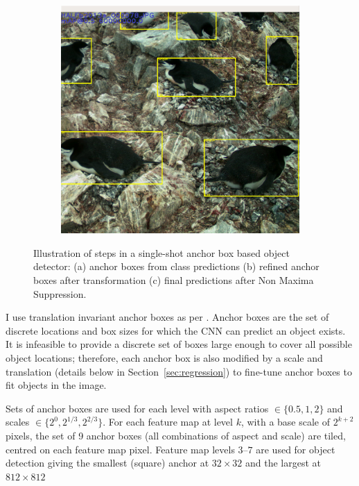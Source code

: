 \begin{figure}[htb]
\begin{subfigure}[t]{0.30\textwidth}
  \caption{}
  \end{subfigure}%
  \begin{subfigure}[t]{0.32\textwidth}
  \includegraphics[width=0.95\linewidth]{figures/object/final.png}
  \caption{}
  \end{subfigure}%
  \caption{Illustration of steps in a single-shot anchor box based object detector: (a) anchor boxes from class predictions (b) refined anchor boxes after transformation (c) final predictions after Non Maxima Suppression.   }
  \label{fig:anchor_boxes}
\end{figure}


I use translation invariant anchor boxes as per \cite{Wang2017}. Anchor boxes are the set of discrete locations and box sizes for which the \gls{CNN} can predict an object exists. It is infeasible to provide a discrete set of boxes large enough to cover all possible object locations; therefore, each anchor box is also modified by a scale and translation (details below in Section~\ref{sec:regression}) to fine-tune anchor boxes to fit objects in the image.

Sets of anchor boxes are used for each level with aspect ratios $ \in \{0.5, 1, 2\} $ and scales $ \in \{2^0, 2^{1/3}, 2^{2/3}\} $. For each feature map at level $k$, with a base scale of $ 2^{k + 2} $ pixels, the set of 9 anchor boxes (all combinations of aspect and scale) are tiled, centred on each feature map pixel. Feature map levels $3$--$7$ are used for object detection giving the smallest (square) anchor at $32\times32$ and the largest at $812\times812$

